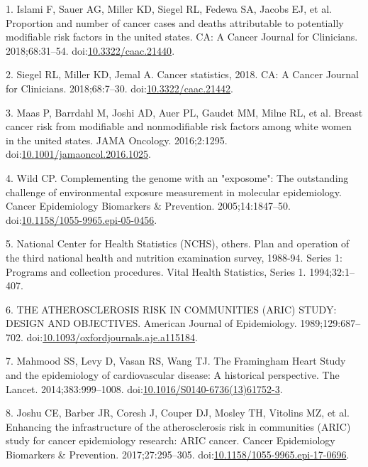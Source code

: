 \documentclass[12pt,oneside]{reedthesis}
\theoremstyle{definition}
\theoremstyle{definition}
\theoremstyle{definition}
\theoremstyle{remark}
\begin{document}
\hypertarget{refs}{}
\leavevmode\hypertarget{ref-Islami_2018}{}%
1. Islami F, Sauer AG, Miller KD, Siegel RL, Fedewa SA, Jacobs EJ, et
al. Proportion and number of cancer cases and deaths attributable to
potentially modifiable risk factors in the united states. CA: A Cancer
Journal for Clinicians. 2018;68:31--54.
doi:\href{https://doi.org/10.3322/caac.21440}{10.3322/caac.21440}.

\leavevmode\hypertarget{ref-Siegel_2018}{}%
2. Siegel RL, Miller KD, Jemal A. Cancer statistics, 2018. CA: A Cancer
Journal for Clinicians. 2018;68:7--30.
doi:\href{https://doi.org/10.3322/caac.21442}{10.3322/caac.21442}.

\leavevmode\hypertarget{ref-Maas_2016}{}%
3. Maas P, Barrdahl M, Joshi AD, Auer PL, Gaudet MM, Milne RL, et al.
Breast cancer risk from modifiable and nonmodifiable risk factors among
white women in the united states. JAMA Oncology. 2016;2:1295.
doi:\href{https://doi.org/10.1001/jamaoncol.2016.1025}{10.1001/jamaoncol.2016.1025}.

\leavevmode\hypertarget{ref-Wild_2005}{}%
4. Wild CP. Complementing the genome with an "exposome": The outstanding
challenge of environmental exposure measurement in molecular
epidemiology. Cancer Epidemiology Biomarkers \& Prevention.
2005;14:1847--50.
doi:\href{https://doi.org/10.1158/1055-9965.epi-05-0456}{10.1158/1055-9965.epi-05-0456}.

\leavevmode\hypertarget{ref-nhanes_1994}{}%
5. National Center for Health Statistics (NCHS), others. Plan and
operation of the third national health and nutrition examination survey,
1988-94. Series 1: Programs and collection procedures. Vital Health
Statistics, Series 1. 1994;32:1--407.

\leavevmode\hypertarget{ref-ARIC_1989}{}%
6. THE ATHEROSCLEROSIS RISK IN COMMUNITIES (ARIC) STUDY: DESIGN AND
OBJECTIVES. American Journal of Epidemiology. 1989;129:687--702.
doi:\href{https://doi.org/10.1093/oxfordjournals.aje.a115184}{10.1093/oxfordjournals.aje.a115184}.

\leavevmode\hypertarget{ref-Mahmood_2014}{}%
7. Mahmood SS, Levy D, Vasan RS, Wang TJ. The Framingham Heart Study and
the epidemiology of cardiovascular disease: A historical perspective.
The Lancet. 2014;383:999--1008.
doi:\href{https://doi.org/10.1016/S0140-6736(13)61752-3}{10.1016/S0140-6736(13)61752-3}.

\leavevmode\hypertarget{ref-Joshu_2017}{}%
8. Joshu CE, Barber JR, Coresh J, Couper DJ, Mosley TH, Vitolins MZ, et
al. Enhancing the infrastructure of the atherosclerosis risk in
communities (ARIC) study for cancer epidemiology research: ARIC cancer.
Cancer Epidemiology Biomarkers \& Prevention. 2017;27:295--305.
doi:\href{https://doi.org/10.1158/1055-9965.epi-17-0696}{10.1158/1055-9965.epi-17-0696}.
\end{document}
